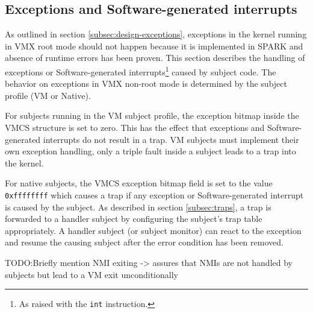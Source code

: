 \subsection{Exceptions and Software-generated interrupts}
As outlined in section \ref{subsec:design-exceptions}, exceptions in the kernel
running in VMX root mode should not happen because it is implemented in SPARK
and absence of runtime errors has been proven.  This section describes the
handling of exceptions or Software-generated interrupts\footnote{As raised with
the \texttt{int} instruction.} caused by subject code. The behavior on
exceptions in VMX non-root mode is determined by the subject profile (VM or
Native).

For subjects running in the VM subject profile, the exception bitmap inside the
VMCS structure is set to zero. This has the effect that exceptions and
Software-generated interrupts do not result in a trap. VM subjects must
implement their own exception handling, only a triple fault inside a subject
leads to a trap into the kernel.

For native subjects, the VMCS exception bitmap field is set to the value
\texttt{0xffffffff} which causes a trap if any exception or Software-generated
interrupt is caused by the subject. As described in section \ref{subsec:traps},
a trap is forwarded to a handler subject by configuring the subject's trap table
appropriately. A handler subject (or subject monitor) can react to the exception
and resume the causing subject after the error condition has been removed.

TODO:Briefly mention NMI exiting -> assures that NMIs are not handled by
subjects but lead to a VM exit unconditionally

